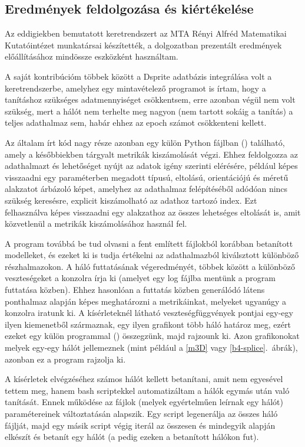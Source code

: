 \subsection{Eredmények feldolgozása és kiértékelése}

Az eddigiekben bemutatott keretrendszert az MTA Rényi Alfréd Matematikai Kutatóintézet munkatársai készítették, a dolgozatban prezentált eredmények előállításához mindössze eszközként használtam.

A saját kontribúcióm többek között a Dsprite adatbázis integrálása volt a keretrendszerbe, amelyhez egy mintavételező programot is írtam, hogy a tanításhoz szükséges adatmennyiséget csökkentsem, erre azonban végül nem volt szükség, mert a hálót nem terhelte meg nagyon (nem tartott sokáig a tanítás) a teljes adathalmaz sem, habár ehhez az epoch számot csökkenteni kellett. 

Az általam írt kód nagy része azonban egy külön Python fájlban () található, amely a későbbiekben tárgyalt metrikák kiszámolását végzi. Ehhez feldolgozza az adathalmazt és lehetőséget nyújt az adatok igény szerinti elérésére, például képes visszaadni egy paraméterben megadott típusú, eltolású, orientációjú és méretű alakzatot árbázoló képet, amelyhez az adathalmaz felépítéséből adódóan nincs szükség keresésre, explicit kiszámolható az adathoz tartozó index. Ezt felhasználva képes visszaadni egy alakzathoz az összes lehetséges eltolását is, amit közvetlenül a metrikák kiszámolásához használ fel.

A program továbbá be tud olvasni a fent említett fájlokból korábban betanított modelleket, és ezeket ki is tudja értékelni az adathalmazból kiválsztott különböző részhalmazokon. A háló futtatásának végeredményét, többek között a különböző veszteségeket  a konzolra írja ki (amelyet egy log fájlba mentünk a program futtatása közben). Ehhez hasonlóan a futtatás közben generálódó látens ponthalmaz alapján képes meghatározni a metrikáinkat, melyeket ugyanúgy a konzolra iratunk ki. A kísérleteknél látható veszteségfüggvények pontjai egy-egy ilyen kiemenetből származnak, egy ilyen grafikont több háló határoz meg, ezért ezeket egy külön programmal () összegzünk, majd rajzounk ki. Azon grafikonokat melyek egy-egy hálót jellemeznek (mint például a \ref{m3D} vagy \ref{b4-splice}.~ábrák), azonban ez a program rajzolja ki.

A kísérletek elvégzéséhez számos hálót kellett betanítani, amit nem egyesével tettem meg, hanem bash scriptekkel automatizáltam a hálók egymás után való tanítását. Ennek működése az  fájlok (melyek egyértelműen leírnak egy hálót) paramétereinek változtatásán alapszik. Egy script legenerálja az összes háló  fájlját, majd egy másik script végig iterál az összesen és mindegyik alapján elkészít és betanít egy hálót (a  pedig ezeken a betanított hálókon fut). 


